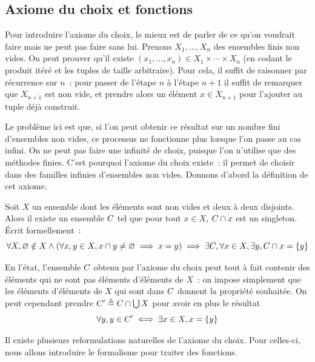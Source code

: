 \subsection{Axiome du choix et fonctions}

Pour introduire l'axiome du choix, le mieux est de parler de ce qu'on voudrait
faire mais ne peut pas faire sans lui. Prenons $X_1,\ldots,X_n$ des ensembles
finis non vides. On peut prouver qu'il existe
$(x_1,\ldots,x_n)\in X_1\times\cdots\times X_n$ (en codant le produit itéré et
les tuples de taille arbitraire). Pour cela, il suffit de raisonner par
récurrence sur $n$~: pour passer de l'étape $n$ à l'étape $n+1$ il suffit de
remarquer que $X_{n+1}$ est non vide, et prendre alors un élément $x\in X_{n+1}$
pour l'ajouter au tuple déjà construit.

Le problème ici est que, si l'on peut obtenir ce résultat sur un nombre fini
d'ensembles non vides, ce processus ne fonctionne plus lorsque l'on passe au cas
infini. On ne peut pas faire une infinité de choix, puisque l'on n'utilise que
des méthodes finies. C'est pourquoi l'axiome du choix existe~: il permet de
choisir dans des familles infinies d'ensembles non vides. Donnons d'abord la
définition de cet axiome.

\begin{axiom}[Choix]\label{ax.ZF.AC}
  Soit $X$ un ensemble dont les éléments sont non vides et deux à deux
  disjoints. Alors il existe un ensemble $C$ tel que pour tout $x\in X$,
  $C\cap x$ est un singleton. \'Ecrit formellement~:
  \[\forall X, \varnothing\notin X \land
  (\forall x,y \in X, x \cap y \neq
  \varnothing \implies x = y)
  \implies \exists C, \forall x \in X, \exists y, C \cap x = \{y\}\]
\end{axiom}

\begin{remark}
  En l'état, l'ensemble $C$ obtenu par l'axiome du choix peut tout à fait
  contenir des éléments qui ne sont pas éléments d'éléments de $X$~: on impose
  simplement que les éléments d'éléments de $X$ qui sont dans $C$ donnent
  la propriété souhaitée. On peut cependant prendre
  $C'\triangleq C\cap \bigcup X$ pour avoir en plus le résultat
  \[\forall y, y \in C' \iff \exists x \in X, x = \{y\}\]
\end{remark}

\noindent
Il existe plusieurs reformulations naturelles de l'axiome du choix. Pour
celles-ci, nous allons introduire le formalisme pour traiter des fonctions.

